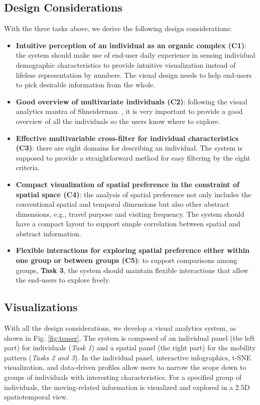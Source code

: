 \documentclass{ieeeaccess}
\begin{document}
\subsection{Design Considerations}

With the three tasks above, we derive the following design considerations:

\begin{itemize}
\item \textbf{Intuitive perception of an individual as an organic complex (C1)}: the system should make use of end-user daily experience in sensing individual demographic characteristics to provide intuitive visualization instead of lifeless representation by numbers. The visual design needs to help end-users to pick desirable information from the whole.
\item \textbf{Good overview of multivariate individuals (C2)}: following the visual analytics mantra of Shneiderman~\cite{RN459}, it is very important to provide a good overview of all the individuals so the users know where to explore.
\item \textbf{Effective multivariable cross-filter for individual characteristics (C3)}: there are eight domains for describing an individual. The system is supposed to provide a straightforward method for easy filtering by the eight criteria.
\item \textbf{Compact visualization of spatial preference in the constraint of spatial space (C4)}: the analysis of spatial preference not only includes the conventional spatial and temporal dimensions but also other abstract dimensions, e.g., travel purpose and visiting frequency. The system should have a compact layout to support simple correlation between spatial and abstract information.
\item \textbf{Flexible interactions for exploring spatial preference either within one group or between groups (C5)}: to support comparisons among groups, \textbf{Task 3}, the system should maintain flexible interactions that allow the end-users to explore freely.
\end{itemize}


\subsection{Visualizations}
\label{subsec:vis}

With all the design considerations, we develop a visual analytics system, as shown in Fig. \ref{fig:teaser}. The system is composed of an individual panel (the left part) for individuals (\textit{Task 1}) and a spatial panel (the right part) for the mobility pattern (\textit{Tasks 2 and 3}). In the individual panel, interactive infographics, t-SNE visualization, and data-driven profiles allow users to narrow the scope down to groups of individuals with interesting characteristics. For a specified group of individuals, the moving-related information is visualized and explored in a 2.5D spatiotemporal view.
\end{document}
